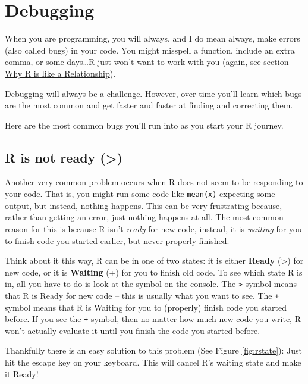 \documentclass[
]{book}
\begin{document}
\hypertarget{debugging}{%
\section{Debugging}\label{debugging}}

When you are programming, you will always, and I do mean always, make errors (also called bugs) in your code. You might misspell a function, include an extra comma, or some days\ldots R just won't want to work with you (again, see section \protect\hyperlink{rrelationship}{Why R is like a Relationship}).

Debugging will always be a challenge. However, over time you'll learn which bugs are the most common and get faster and faster at finding and correcting them.

Here are the most common bugs you'll run into as you start your R journey.

\hypertarget{r-is-not-ready}{%
\subsection{R is not ready (\textgreater)}\label{r-is-not-ready}}

Another very common problem occurs when R does not seem to be responding to your code. That is, you might run some code like \texttt{mean(x)} expecting some output, but instead, nothing happens. This can be very frustrating because, rather than getting an error, just nothing happens at all. The most common reason for this is because R isn't \emph{ready} for new code, instead, it is \emph{waiting} for you to finish code you started earlier, but never properly finished.

Think about it this way, R can be in one of two states: it is either \textbf{Ready} (\textgreater) for new code, or it is \textbf{Waiting} (+) for you to finish old code. To see which state R is in, all you have to do is look at the symbol on the console. The \texttt{\textgreater{}} symbol means that R is Ready for new code -- this is usually what you want to see. The \texttt{+} symbol means that R is Waiting for you to (properly) finish code you started before. If you see the \texttt{+} symbol, then no matter how much new code you write, R won't actually evaluate it until you finish the code you started before.

Thankfully there is an easy solution to this problem (See Figure \ref{fig:rstate}): Just hit the escape key on your keyboard. This will cancel R's waiting state and make it Ready!
\end{document}
